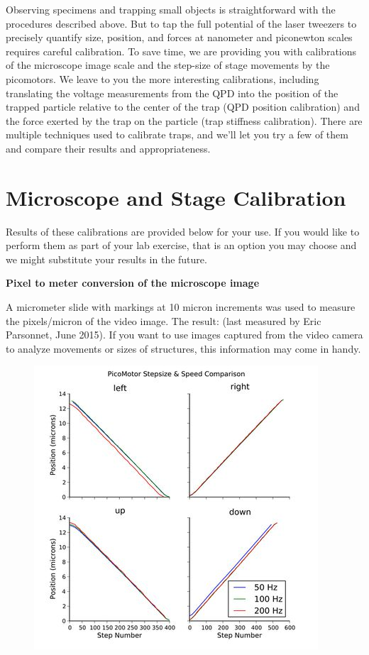 \documentclass{../lab}
\begin{document}
Observing specimens and trapping small objects is straightforward with the procedures described above. But to tap the full potential of the laser tweezers to precisely quantify size, position, and forces at nanometer and piconewton scales requires careful calibration. To save time, we are providing you with calibrations of the microscope image scale and the step-size of stage movements by the picomotors. We leave to you the more interesting calibrations, including translating the voltage measurements from the QPD into the position of the trapped particle relative to the center of the trap (QPD position calibration) and the force exerted by the trap on the particle (trap stiffness calibration). There are multiple techniques used to calibrate traps, and we'll let you try a few of them and compare their results and appropriateness.

\section{Microscope and Stage Calibration}

Results of these calibrations are provided below for your use. If you would like to perform them as part of your lab exercise, that is an option you may choose and we might substitute your results in the future.

\textbf{Pixel to meter conversion of the microscope image}

A micrometer slide with markings at 10 micron increments was used to measure the pixels/micron of the video image. The result:  (last measured by Eric Parsonnet, June 2015). If you want to use images captured from the video camera to analyze movements or sizes of structures, this information may come in handy.

\begin{figure}[h]
    \centering
    \href{http://experimentationlab.berkeley.edu/sites/default/files/images/400px-Stepsize-ayars.jpg}{\includegraphics[width=0.5\linewidth]{images/400px-Stepsize-ayars.jpg}}
    \caption{}
    \label{fig:400px-Stepsize-ayars}
\end{figure}
\end{document}
